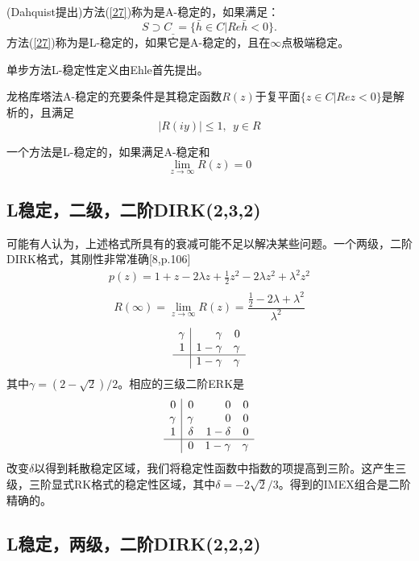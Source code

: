\documentclass[12pt,a4paper]{article}
\begin{document}
(Dahquist提出)方法(\ref{27})称为是A-稳定的，如果满足：
\begin{equation*}
S\supset C_{\_}=\{\bar{h}\in C|Re\bar{h}<0\}.
\end{equation*}
方法(\ref{27})称为是L-稳定的，如果它是A-稳定的，且在$\infty$点极端稳定。

单步方法L-稳定性定义由Ehle首先提出。

龙格库塔法A-稳定的充要条件是其稳定函数$R(z)$于复平面$\{z\in C|Rez<0\}$是解析的，且满足
\begin{equation}
|R(iy)|\le 1,~~y\in R
\end{equation}

一个方法是L-稳定的，如果满足A-稳定和
\begin{equation*}
\lim\limits_{z\to\infty}R(z)=0
\end{equation*}
\subsection{L稳定，二级，二阶DIRK(2,3,2)}

可能有人认为，上述格式所具有的衰减可能不足以解决某些问题。一个两级，二阶DIRK格式，其刚性非常准确[8,p.106]
\begin{gather*}
p(z)=1+z-2\lambda z+\frac{1}{2}z^2-2\lambda z^2+\lambda^2z^2\\
\end{gather*}
\begin{equation*}
R(\infty)=\lim\limits_{z\to \infty}R(z)=\frac{\frac{1}{2}-2\lambda+\lambda^2}{\lambda^2}
\end{equation*}
\[
\begin{array}{r|rr}
\gamma & \gamma & 0\\1 & 1-\gamma & \gamma\\
\hline
& 1-\gamma & \gamma
\end{array}
\]
其中$\gamma=(2-\sqrt{2})/2$。相应的三级二阶ERK是
\[
\begin{array}{r|rrr}
0 & 0 & 0 & 0\\
\gamma & \gamma & 0 & 0 \\
1 & \delta& 1-\delta & 0\\
\hline
& 0 & 1-\gamma & \gamma
\end{array}
\]
改变$\delta$以得到耗散稳定区域，我们将稳定性函数中指数的项提高到三阶。这产生三级，三阶显式RK格式的稳定性区域，其中$\delta=-2\sqrt{2}/3$。得到的IMEX组合是二阶精确的。

\subsection{L稳定，两级，二阶DIRK(2,2,2)}
\end{document}
